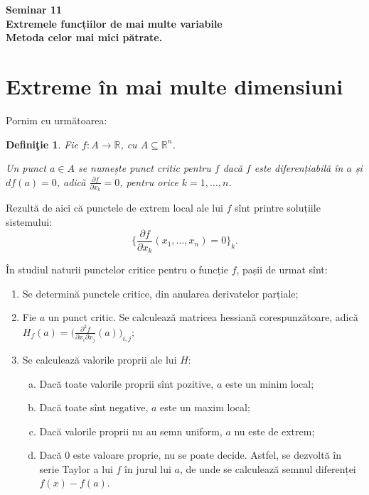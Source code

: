 \documentclass[11pt,a4paper]{article}
\newcommand\seq{\subseteq}
\newcommand\RR{\mathbb{R}}
\theoremstyle{dotless}
\theoremstyle{dotlessdr}
\newtheorem{definition}{Defini\c{t}ie}[section]
\begin{document}
\begin{center}
  {
    \large\textbf{
      Seminar 11 \\
      Extremele funcțiilor de mai multe variabile \\
      Metoda celor mai mici pătrate.
    }}
\end{center}

\vspace{1cm}

\section{Extreme în mai multe dimensiuni}
\label{sec:extreme}

Pornim cu următoarea:

\begin{definition}\label{def:p-critic}
  Fie $f : A \to \RR$, cu $A \seq \RR^n$.

  Un punct $a \in A$ se numește \emph{punct critic} pentru $f$ dacă $f$ este
  diferențiabilă în $a$ și $df(a) = 0$, adică $\frac{\partial f}{\partial x_k} = 0$,
  pentru orice $k = 1, \dots, n$.
\end{definition}

Rezultă de aici că punctele de extrem local ale lui $f$ sînt printre soluțiile
sistemului:
\[
  \Big\{ \frac{\partial f}{\partial x_k}(x_1, \dots, x_n) = 0 \Big\}_k.
\]

În studiul naturii punctelor critice pentru o funcție $f$, pașii de urmat sînt:
\begin{enumerate}[(1)]
\item Se determină punctele critice, din anularea derivatelor parțiale;
\item Fie $a$ un punct critic. Se calculează matricea hessiană corespunzătoare,
  adică $H_f(a) = \Big( \frac{\partial^2 f}{\partial x_i \partial x_j} (a) \Big)_{i,j}$;
\item Se calculează valorile proprii ale lui $H$:
  \begin{enumerate}[(a)]
  \item Dacă toate valorile proprii sînt pozitive, $a$ este un minim local;
  \item Dacă toate sînt negative, $a$ este un maxim local;
  \item Dacă valorile proprii nu au semn uniform, $a$ nu este de extrem;
  \item Dacă 0 este valoare proprie, nu se poate decide. Astfel, se dezvoltă
    în serie Taylor a lui $f$ în jurul lui $a$, de unde se calculează semnul
    diferenței $f(x) - f(a)$.
  \end{enumerate}
\end{enumerate}
\end{document}

